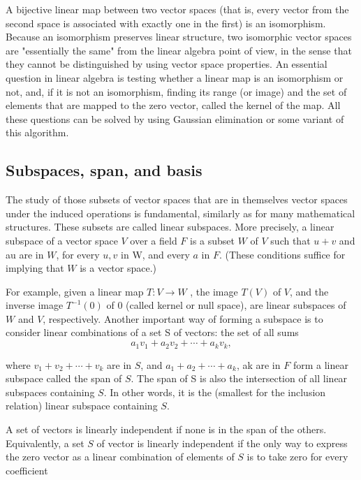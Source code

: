 \documentclass[a4paper,12pt]{article}
\begin{document}
    A bijective linear map between two vector spaces (that is, every vector from the second space is associated with
    exactly one in the first) is an isomorphism. Because an isomorphism preserves linear structure, two isomorphic
    vector spaces are "essentially the same" from the linear algebra point of view, in the sense that they cannot be
    distinguished by using vector space properties. An essential question in linear algebra is testing whether a linear
    map is an isomorphism or not, and, if it is not an isomorphism, finding its range (or image) and the set of elements
    that are mapped to the zero vector, called the kernel of the map. All these questions can be solved by using
    Gaussian elimination or some variant of this algorithm.

    \subsection{Subspaces, span, and basis}
    \label{span}
    The study of those subsets of vector spaces that are in themselves vector spaces under the induced operations is
    fundamental, similarly as for many mathematical structures. These subsets are called linear subspaces. More
    precisely, a linear subspace of a vector space $V$ over a field $F$ is a subset $W$ of $V$ such that $u+v$ and au are
    in $W$, for every $u, v$ in W, and every $a$ in $F$. (These conditions suffice for implying that $W$ is a vector space.)


    For example, given a linear map $T:V\to W$ , the image $T(V)$ of $V$, and the inverse image $ T^{-1}(0)$
    of 0 (called kernel or null space), are linear subspaces of $W$ and $V$, respectively.
    Another important way of forming a subspace is to consider linear combinations of a set S of vectors: the set of
    all sums
    $$ a_{1}v_{1}+a_{2}v_{2}+\cdots +a_{k}v_{k}, $$

    where $v_{1}+v_{2}+\cdots +v_{k}$ are in $S$, and $a_{1}+a_{2}+\cdots +a_{k}$, ak are in $F$ form a linear subspace
    called the span of $S$. The span of S is also the
    intersection of all linear subspaces containing $S$. In other words, it is the (smallest for the inclusion relation)
    linear subspace containing $S$.

    A set of vectors is linearly independent if none is in the span of the others. Equivalently, a set $S$ of vector is
    linearly independent if the only way to express the zero vector as a linear combination of elements of $S$ is to
    take zero for every coefficient
\end{document}
